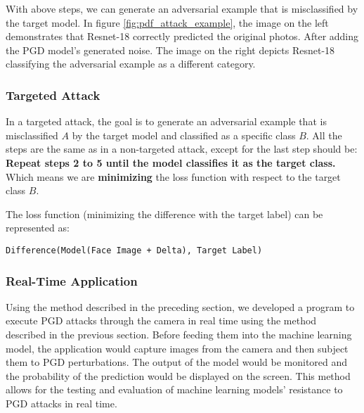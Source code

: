 With above steps, we can generate an adversarial example that is misclassified by the target model. In figure \ref{fig:pdf_attack_example}, the image on the left demonstrates that Resnet-18 correctly predicted the original photos. After adding the PGD model's generated noise. The image on the right depicts Resnet-18 classifying the adversarial example as a different category.

\subsubsection{Targeted Attack}

In a targeted attack, the goal is to generate an adversarial example that is misclassified $A$ by the target model and classified as a specific class $B$. All the steps are the same as in a non-targeted attack, except for the last step should be: \textbf{Repeat steps 2 to 5 until the model classifies it as the target class.} Which means we are \textbf{minimizing} the loss function with respect to the target class $B$.

The loss function (minimizing the difference with the target label) can be represented as:

\begin{center}
    \verb|Difference(Model(Face Image + Delta), Target Label)|
\end{center}


\subsubsection{Real-Time Application}

Using the method described in the preceding section, we developed a program to execute PGD attacks through the camera in real time using the method described in the previous section. Before feeding them into the machine learning model, the application would capture images from the camera and then subject them to PGD perturbations. The output of the model would be monitored and the probability of the prediction would be displayed on the screen. This method allows for the testing and evaluation of machine learning models' resistance to PGD attacks in real time.


